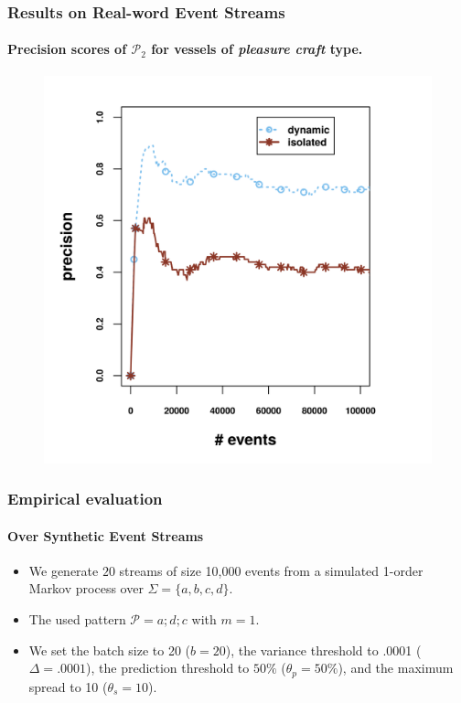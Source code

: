 \begin{frame}
	
	\frametitle{Results on Real-word Event Streams }
	\framesubtitle{Precision scores of $\mathcal{P}_2$  for vessels of \textit{pleasure craft} type.}
	
\begin{figure}[]
	\centering
	\includegraphics[width=.9\textwidth,height=.8\textheight]{../chapters/figures/synopses/new/precision_p2.png}
	
\end{figure}
	
\end{frame}




\begin{frame}
	
	\frametitle{Empirical evaluation }
	\framesubtitle{Over Synthetic Event Streams}
	\begin{itemize}
		\item<1-> We generate $20$ streams of size 10,000 events from a simulated 1-order Markov process over $\Sigma=\{a, b, c, d\}$.
		
		\item<1->The used pattern $\mathcal{P}=a ; d ; c$ with $m=1$.
		
		\item<1-> We set the batch size to 20 ($b=20$), the variance threshold to .0001 ($\Delta=.0001$), the  \pmcmr prediction threshold to $50\%$ ($\theta_{p}=50\%$), and the maximum spread to 10 ($\theta_{s}=10$).
	\end{itemize}
	
\end{frame}


